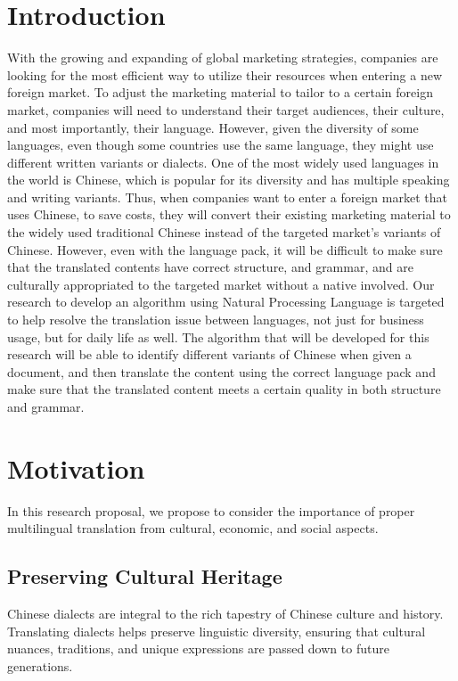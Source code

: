 \documentclass[sigconf]{acmart}
\begin{document}
\section{Introduction}
With the growing and expanding of global marketing strategies, companies are looking for the most efficient way to utilize their resources when entering a new foreign market. To adjust the marketing material to tailor to a certain foreign market, companies will need to understand their target audiences, their culture, and most importantly, their language. However, given the diversity of some languages, even though some countries use the same language, they might use different written variants or dialects. One of the most widely used languages in the world is Chinese, which is popular for its diversity and has multiple speaking and writing variants. Thus, when companies want to enter a foreign market that uses Chinese, to save costs, they will convert their existing marketing material to the widely used traditional Chinese instead of the targeted market's variants of Chinese. However, even with the language pack, it will be difficult to make sure that the translated contents have correct structure, and grammar, and are culturally appropriated to the targeted market without a native involved. Our research to develop an algorithm using Natural Processing Language is targeted to help resolve the translation issue between languages, not just for business usage, but for daily life as well. The algorithm that will be developed for this research will be able to identify different variants of Chinese when given a document, and then translate the content using the correct language pack and make sure that the translated content meets a certain quality in both structure and grammar.

\section{Motivation}
In this research proposal, we propose to consider the importance of proper multilingual translation from cultural, economic, and social aspects.

\subsection{Preserving Cultural Heritage}
Chinese dialects are integral to the rich tapestry of Chinese culture and history. Translating dialects helps preserve linguistic diversity, ensuring that cultural nuances, traditions, and unique expressions are passed down to future generations.
\end{document}
